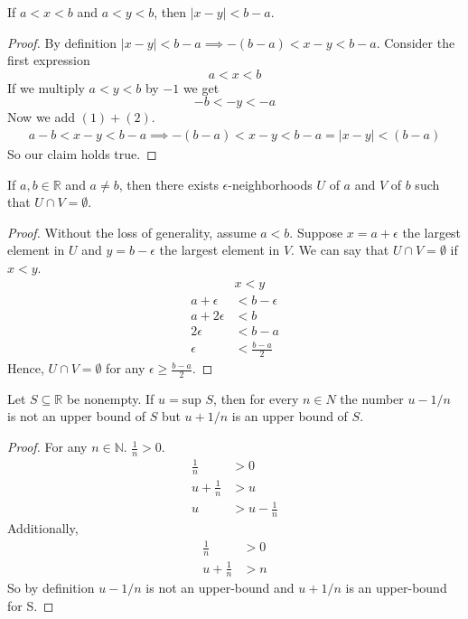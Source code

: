 \documentclass[12pt]{article}
\newcommand{\N}{\mathbb{N}}
\newcommand{\R}{\mathbb{R}}
\newenvironment{claim}[2][Claim]{\begin{trivlist}
		\item[\hskip \labelsep {\bfseries #1}\hskip \labelsep {\bfseries #2}]}{\end{trivlist}}
\begin{document}
	\begin{claim}{2.2.5}
		If $a < x < b$ and $a < y < b$, then $|x - y| < b - a$.
	\end{claim}
	\begin{proof}
		By definition $|x - y| < b - a \implies -(b - a) < x  - y < b - a$.  Consider the first expression
		\begin{equation}
		a < x < b
		\end{equation}
		If we multiply $a < y < b$ by $-1$ we get
		\begin{equation}
		-b < -y < -a
		\end{equation}
		Now we add $(1) + (2)$.\\
		\begin{align*}
		a-b < x -y < b - a \implies -(b - a) < x - y < b - a = |x - y| < (b-a)
		\end{align*}
		So our claim holds true.
	\end{proof}

\begin{claim}{2.2.17}
	If $a,b \in \R$ and $a \neq b$, then there exists $\epsilon$-neighborhoods $U$ of $a$ and $V$ of $b$ such that $U \cap V = \emptyset$.
\end{claim}
\begin{proof}
	Without the loss of generality, assume $a < b$. Suppose $x = a + \epsilon$ the largest element in $U$ and $y = b - \epsilon$ the largest element in $V$. We can say that $U \cap V = \emptyset$ if $x < y$.
	\begin{align*}
		&x < y \\
		a + \epsilon &< b - \epsilon\\
		a + 2 \epsilon &< b\\
		2 \epsilon &< b - a\\
		\epsilon &< \frac{b - a}{2}
	\end{align*}
	Hence, $U \cap V = \emptyset$ for any $\epsilon \geq \frac{b - a}{2}$.
\end{proof}

\begin{claim}{2.3.9}
	Let $S \subseteq \R$ be nonempty. If $u = \text{sup } S$, then for every $n \in N$ the number $u - 1/n$ is not an upper bound of $S$ but $u + 1/n$ is an upper bound of $S$. 
\end{claim}
\begin{proof}
	For any $n \in \N$. $\frac{1}{n} > 0$.
	\begin{align*}
		\frac{1}{n} &> 0 \\
		u + \frac{1}{n} & > u\\
		u & > u - \frac{1}{n}
	\end{align*}
	Additionally,
	\begin{align*}
	\frac{1}{n} &> 0 \\
	u + \frac{1}{n} & > n
	\end{align*}
	So by definition $u - 1/n$ is not an upper-bound and $u + 1/n$ is an upper-bound for S.
\end{proof}
\end{document}

